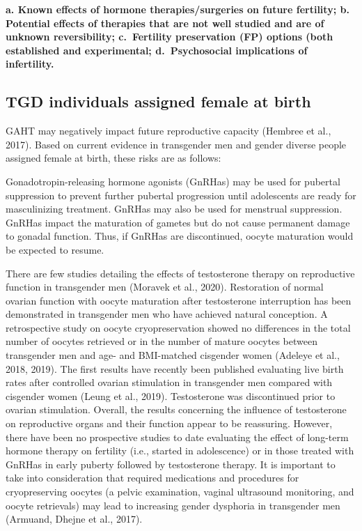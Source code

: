 \documentclass[
]{book}
\begin{document}
\textbf{a. Known effects of hormone therapies/surgeries on future fertility;
b. Potential effects of therapies that are not well studied and are of unknown reversibility;
c.~Fertility preservation (FP) options (both established and experimental;
d.~Psychosocial implications of infertility.}

\hypertarget{tgd-individuals-assigned-female-at-birth}{%
\subsection*{TGD individuals assigned female at birth}\label{tgd-individuals-assigned-female-at-birth}}

GAHT may negatively impact future reproductive capacity (Hembree et al., 2017). Based on
current evidence in transgender men and gender
diverse people assigned female at birth, these
risks are as follows:

Gonadotropin-releasing hormone agonists
(GnRHas) may be used for pubertal suppression
to prevent further pubertal progression until
adolescents are ready for masculinizing treatment. GnRHas may also be used for menstrual
suppression. GnRHas impact the maturation of
gametes but do not cause permanent damage to
gonadal function. Thus, if GnRHas are discontinued, oocyte maturation would be expected
to resume.

There are few studies detailing the effects of
testosterone therapy on reproductive function in
transgender men (Moravek et al., 2020).
Restoration of normal ovarian function with
oocyte maturation after testosterone interruption
has been demonstrated in transgender men who
have achieved natural conception. A retrospective
study on oocyte cryopreservation showed no differences in the total number of oocytes retrieved
or in the number of mature oocytes between
transgender men and age- and BMI-matched cisgender women (Adeleye et al., 2018, 2019). The
first results have recently been published evaluating live birth rates after controlled ovarian stimulation in transgender men compared with
cisgender women (Leung et al., 2019). Testosterone
was discontinued prior to ovarian stimulation.
Overall, the results concerning the influence of
testosterone on reproductive organs and their
function appear to be reassuring. However, there
have been no prospective studies to date evaluating the effect of long-term hormone therapy
on fertility (i.e., started in adolescence) or in
those treated with GnRHas in early puberty followed by testosterone therapy. It is important to
take into consideration that required medications
and procedures for cryopreserving oocytes (a
pelvic examination, vaginal ultrasound monitoring, and oocyte retrievals) may lead to increasing
gender dysphoria in transgender men (Armuand,
Dhejne et al., 2017).
\end{document}
